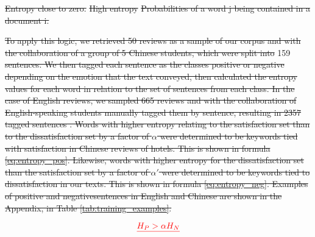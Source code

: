 \documentclass[review]{elsarticle}
\providecommand{\DIFadd}[1]{{\protect\color{blue}\uwave{#1}}} %
\providecommand{\DIFdel}[1]{{\protect\color{red}\sout{#1}}}                      %
\providecommand{\DIFaddbegin}{} %
\providecommand{\DIFaddend}{} %
\providecommand{\DIFdelbegin}{} %
\providecommand{\DIFdelend}{} %
\providecommand{\DIFdelFL}[1]{\DIFdel{#1}} %
\newcommand{\DIFscaledelfig}{0.5}
\newlength{\DIFdelgraphicswidth} %
\newlength{\DIFdelgraphicsheight} %
\newcommand{\DIFaddincludegraphics}[2][]{{\color{blue}\fbox{\DIFOincludegraphics[#1]{#2}}}} %
\newcommand{\DIFdelincludegraphics}[2][]{%
\sbox{\DIFdelgraphicsbox}{\DIFOincludegraphics[#1]{#2}}%
\settoboxwidth{\DIFdelgraphicswidth}{\DIFdelgraphicsbox} %
\settoboxtotalheight{\DIFdelgraphicsheight}{\DIFdelgraphicsbox} %
\scalebox{\DIFscaledelfig}{%
\parbox[b]{\DIFdelgraphicswidth}{\usebox{\DIFdelgraphicsbox}\\[-\baselineskip] \rule{\DIFdelgraphicswidth}{0em}}\llap{\resizebox{\DIFdelgraphicswidth}{\DIFdelgraphicsheight}{%
\setlength{\unitlength}{\DIFdelgraphicswidth}%
\begin{picture}(1,1)%
\thicklines\linethickness{2pt} %
{\color[rgb]{1,0,0}\put(0,0){\framebox(1,1){}}}%
{\color[rgb]{1,0,0}\put(0,0){\line( 1,1){1}}}%
{\color[rgb]{1,0,0}\put(0,1){\line(1,-1){1}}}%
\end{picture}%
}\hspace*{3pt}}} %
} %
\DeclareRobustCommand{\DIFaddbegin}{\DIFOaddbegin \let\includegraphics\DIFaddincludegraphics} %
\DeclareRobustCommand{\DIFaddend}{\DIFOaddend \let\includegraphics\DIFOincludegraphics} %
\DeclareRobustCommand{\DIFdelbegin}{\DIFOdelbegin \let\includegraphics\DIFdelincludegraphics} %
\DeclareRobustCommand{\DIFdelend}{\DIFOaddend \let\includegraphics\DIFOincludegraphics} %
\begin{document}
{%
\DIFdelFL{Entropy close to zero.}}
{%
\DIFdelFL{High entropy}}
{%
\DIFdelFL{Probabilities of a word j being contained in a document i.}}

\DIFdel{To apply this logic, we retrieved 50 reviews as a sample of our corpus and with the collaboration of a group of 5 Chinese students, which were split into }\DIFdelend \DIFaddbegin \DIFadd{We tagged }\DIFaddend 159 \DIFdelbegin \DIFdel{sentences. We then tagged each sentence as the classes positive or negative depending on the emotion that the text conveyed, then calculated the entropy values for each word in relation to the set of sentences from each class. In the case of English reviews, we sampled 665 reviews and with the collaboration of English-speaking students manually tagged them by sentence, resulting in \num[group-separator={,}]{2357} tagged sentences . Words with higher entropy relating to the satisfaction set than to the dissatisfaction set by a factor of \(\alpha\) were determined to be keywords tied with satisfaction in Chinese reviews of hotels. This is shown in formula \ref{eq:entropy_pos}. Likewise, words with higher entropy for the dissatisfaction set than the satisfaction set by a factor of \(\alpha'\) were determined to be keywords tied to dissatisfaction in our texts. This is shown in formula \ref{eq:entropy_neg}. Examples of positive and negativesentences in English and Chinese are shown in the Appendix, in Table \ref{tab:training_examples}. }%

\begin{displaymath}\DIFdel{\label{eq:entropy_pos}
H_{P} > \alpha H_{N} %
}\end{displaymath}
\end{document}
